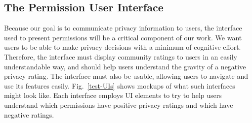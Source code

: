 \documentclass[11pt]{article}
\begin{document}
\subsection{The Permission User Interface}
\label{subsec-perm-ui}

Because our goal is to communicate privacy information to users, the
interface used to present permissions will be a critical component of
our work. We want users to be able to make privacy decisions with a
minimum of cognitive effort. Therefore, the interface must display community
ratings to users in an easily understandable way, and should help
users understand the gravity of a negative privacy rating. The
interface must also be usable, allowing users to navigate and use its
features easily. Fig.~\ref{test-UIs} shows mockups of what such
interfaces might look like. Each interface employs UI elements to try
to help
users understand which permissions have positive privacy
ratings and which have negative ratings.
\end{document}
